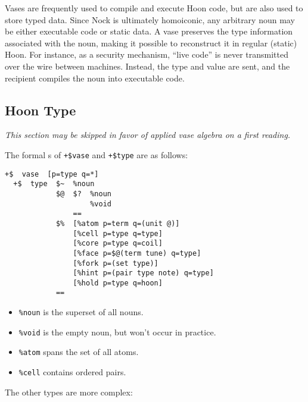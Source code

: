 \documentclass[twoside]{article}
\begin{document}
Vases are frequently used to compile and execute Hoon code, but are also used to store typed data.  Since Nock is ultimately homoiconic, any arbitrary noun may be either executable code or static data.  A vase preserves the type information associated with the noun, making it possible to reconstruct it in regular (static) Hoon.  For instance, as a security mechanism, “live code” is never transmitted over the wire between machines.  Instead, the type and value are sent, and the recipient compiles the noun into executable code.

\subsection{Hoon Type}

\emph{This section may be skipped in favor of applied vase algebra on a first reading.}

The formal s of \lstinline[style=inlinecode]{+$vase} and \lstinline[style=inlinecode]{+$type} are as follows:

\begin{lstlisting}[style=listingcode]
  +$  vase  [p=type q=*]
  +$  type  $~  %noun
            $@  $?  %noun
                    %void
                ==
            $%  [%atom p=term q=(unit @)]
                [%cell p=type q=type]
                [%core p=type q=coil]
                [%face p=$@(term tune) q=type]
                [%fork p=(set type)]
                [%hint p=(pair type note) q=type]
                [%hold p=type q=hoon]
            ==
\end{lstlisting}

\begin{itemize}
  \item  \lstinline[style=inlinecode]{%noun} is the superset of all nouns.
  \item  \lstinline[style=inlinecode]{%void} is the empty noun, but won't occur in practice.
  \item  \lstinline[style=inlinecode]{%atom} spans the set of all atoms.
  \item  \lstinline[style=inlinecode]{%cell} contains ordered pairs.
\end{itemize}

\noindent
The other types are more complex:
\end{document}
